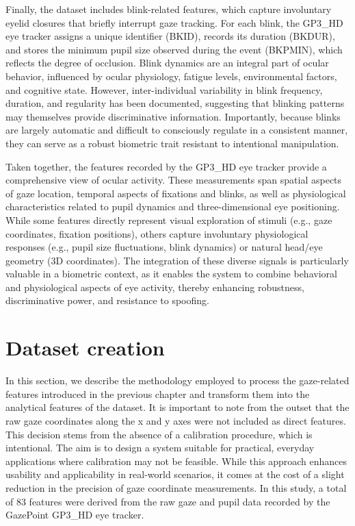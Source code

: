 \documentclass[12pt]{report}
\begin{document}
Finally, the dataset includes blink-related features, which capture involuntary eyelid closures that briefly interrupt gaze tracking. 
For each blink, the GP3\_HD eye tracker assigns a unique identifier (BKID), records its duration (BKDUR), and stores the minimum pupil size observed during the event (BKPMIN), which reflects the degree of occlusion. 
Blink dynamics are an integral part of ocular behavior, influenced by ocular physiology, fatigue levels, environmental factors, and cognitive state. 
However, inter-individual variability in blink frequency, duration, and regularity has been documented, suggesting that blinking patterns may themselves provide discriminative information. 
Importantly, because blinks are largely automatic and difficult to consciously regulate in a consistent manner, they can serve as a robust biometric trait resistant to intentional manipulation.

Taken together, the features recorded by the GP3\_HD eye tracker provide a comprehensive view of ocular activity. 
These measurements span spatial aspects of gaze location, temporal aspects of fixations and blinks, as well as physiological characteristics related to pupil dynamics and three-dimensional eye positioning.
While some features directly represent visual exploration of stimuli (e.g., gaze coordinates, fixation positions), others capture involuntary physiological responses (e.g., pupil size fluctuations, blink dynamics) or natural head/eye geometry (3D coordinates). 
The integration of these diverse signals is particularly valuable in a biometric context, as it enables the system to combine behavioral and physiological aspects of eye activity, thereby enhancing robustness, discriminative power, and resistance to spoofing.

\section{Dataset creation}

In this section, we describe the methodology employed to process the gaze-related features introduced in the previous chapter and transform them into the analytical features of the dataset. 
It is important to note from the outset that the raw gaze coordinates along the x and y axes were not included as direct features. 
This decision stems from the absence of a calibration procedure, which is intentional. 
The aim is to design a system suitable for practical, everyday applications where calibration may not be feasible. 
While this approach enhances usability and applicability in real-world scenarios, it comes at the cost of a slight reduction in the precision of gaze coordinate measurements.
In this study, a total of 83 features were derived from the raw gaze and pupil data recorded by the GazePoint GP3\_HD eye tracker. 
\end{document}
